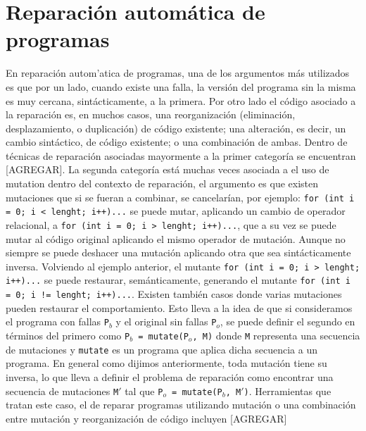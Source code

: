 \chapter[Reparaci\'on]{Reparaci\'on autom\'atica de programas}
\label{sec:preliminares.repair}

En reparaci\'on autom'atica de programas, una de los argumentos m\'as utilizados es que por un lado, cuando existe una falla, la versi\'on del programa sin la misma es muy cercana, sint\'acticamente, a la primera. Por otro lado el c\'odigo asociado a la reparaci\'on es, en muchos casos, una reorganizaci\'on (eliminaci\'on, desplazamiento, o duplicaci\'on) de c\'odigo existente; una alteraci\'on, es decir, un cambio sint\'actico, de c\'odigo existente; o una combinaci\'on de ambas. Dentro de t\'ecnicas de reparaci\'on asociadas mayormente a la primer categor\'ia se encuentran [AGREGAR]. La segunda categor\'ia est\'a muchas veces asociada a el uso de mutation dentro del contexto de reparaci\'on, el argumento es que existen mutaciones que si se fueran a combinar, se cancelar\'ian, por ejemplo:
\lstinline|for (int i = 0; i < lenght; i++)...| se puede mutar, aplicando un cambio de operador relacional, a \lstinline|for (int i = 0; i > lenght; i++)...|, que a su vez se puede mutar al c\'odigo original aplicando el mismo operador de mutaci\'on. Aunque no siempre se puede deshacer una mutaci\'on aplicando otra que sea sint\'acticamente inversa. Volviendo al ejemplo anterior, el mutante \lstinline|for (int i = 0; i > lenght; i++)...| se puede restaurar, sem\'anticamente, generando el mutante \lstinline|for (int i = 0; i != lenght; i++)...|. Existen tambi\'en casos donde varias mutaciones pueden restaurar el comportamiento. Esto lleva a la idea de que si consideramos el programa con fallas \texttt{P$_b$} y el original sin fallas \texttt{P$_o$}, se puede definir el segundo en t\'erminos del primero como \texttt{P$_b$ = mutate(P$_o$, M)} donde \texttt{M} representa una secuencia de mutaciones y \texttt{mutate} es un programa que aplica dicha secuencia a un programa. En general como dijimos anteriormente, toda mutaci\'on tiene su inversa, lo que lleva a definir el problema de reparaci\'on como encontrar una secuencia de mutaciones \texttt{M$\prime$} tal que \texttt{P$_o$ = mutate(P$_b$, M$\prime$)}. Herramientas que tratan este caso, el de reparar programas utilizando mutaci\'on o una combinaci\'on entre mutaci\'on y reorganizaci\'on de c\'odigo incluyen [AGREGAR]